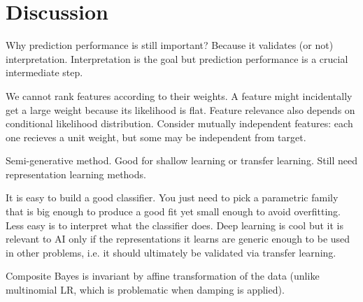 \documentclass[english]{scrartcl}
\def\y{{\mathbf{y}}}
\def\y{{\mathbf{z}}}
\begin{document}




\section{Discussion}
\label{sec:discussion}

{\color{red} Why prediction performance is still important? Because it validates (or not) interpretation. Interpretation is the goal but prediction performance is a crucial intermediate step.}

{\color{red} We cannot rank features according to their weights. A feature might incidentally get a large weight because its likelihood is flat. Feature relevance also depends on conditional likelihood distribution. Consider mutually independent features: each one recieves a unit weight, but some may be independent from target.}

{\color{red} Semi-generative method. Good for shallow learning or transfer learning. Still need representation learning methods.}

{\color{red} It is easy to build a good classifier. You just need to pick a parametric family that is big enough to produce a good fit yet small enough to avoid overfitting. Less easy is to interpret what the classifier does. Deep learning is cool but it is relevant to AI only if the representations it learns are generic enough to be used in other problems, i.e. it should ultimately be validated via transfer learning.}

{\color{red} Composite Bayes is invariant by affine transformation of the data (unlike multinomial LR, which is problematic when damping is applied).}
\end{document}
